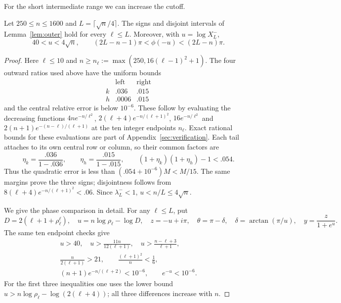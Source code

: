 For the short intermediate range we can increase the cutoff.
\begin{lemma}\label{lem:finitebridge}
Let $250\le n\le1600$ and $L=\lceil\sqrt n/4\rceil$. The signs and disjoint intervals of Lemma~\ref{lem:outer} hold for every $\ell\le L$. Moreover, with $u=\log X_L^-$,
\begin{equation}\label{eq:finite-phase-match}
40<u<4\sqrt n,\qquad
(2L-n-1)\pi<\phi(-u)<(2L-n)\pi.
\end{equation}
\end{lemma}
\begin{proof}
Here $\ell\le10$ and
$n\ge n_\ell:=\max(250,16(\ell-1)^2+1)$.
The four outward ratios used above have the uniform bounds
\[
\begin{array}{c|cc}
 &\text{left}&\text{right}\\ \hline
k&.036&.015\\
h&.0006&.015
\end{array}
\]
and the central relative error is below $10^{-6}$.
These follow by evaluating the decreasing functions
$4n e^{-n/\ell^2}$, $2(\ell+4)e^{-n/(\ell+1)^2}$,
$16e^{-n/\ell^2}$ and $2(n+1)e^{-(n-\ell)/(\ell+1)}$
at the ten integer endpoints $n_\ell$. Exact rational bounds for these evaluations are part of Appendix~\ref{sec:verification}.
Each tail attaches to its own central row or column, so their common factors are
\[
\eta_k=\frac{.036}{1-.036},\qquad
\eta_h=\frac{.015}{1-.015},\qquad
(1+\eta_k)(1+\eta_h)-1<.054.
\]
Thus the quadratic error is less than $(.054+10^{-6})M<M/15$.
The same margins prove the three signs; disjointness follows from
$8(\ell+4)e^{-n/(\ell+1)^2}<.06$.
Since $\lambda_L^-<1$, $u<n/L\le4\sqrt n$.

We give the phase comparison in detail. For any $\ell\le L$, put
\[
D=2(\ell+1+\rho_\ell^\ell),\quad
u=n\log\rho_\ell-\log D,\quad
z=-u+i\pi,\quad \theta=\pi-\delta,\quad
\delta=\arctan(\pi/u),\quad y=\frac z{1+e^u}.
\]
The same ten endpoint checks give
\begin{equation}\label{eq:finite-phase-constants}
\begin{gathered}
u>40,\quad u>\frac{11n}{12(\ell+1)},\quad
u>\frac{n-\ell+3}{\ell+1},\\
\frac n{2(\ell+1)}>21,\qquad
\frac{(\ell+1)^2}{n}<\frac16,\\
(n+1)e^{-n/(\ell+2)}<10^{-6},\qquad e^{-u}<10^{-6}.
\end{gathered}
\end{equation}
For the first three inequalities one uses the lower bound
$u>n\log\rho_\ell-\log(2(\ell+4))$; all three differences increase with $n$.


\end{proof}
